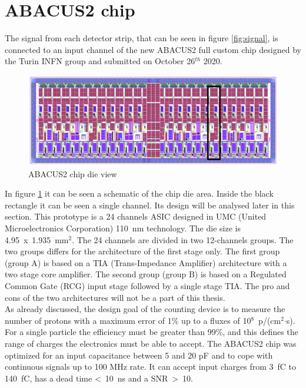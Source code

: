 \section{ABACUS2 chip}\label{chip}
\noindent The signal from each detector strip, that can be seen in figure \ref{fig:signal}, is connected to an input channel of the new ABACUS2 full custom chip\cite{abacus}\cite{dac} designed by the Turin INFN group and submitted on October 26$^{th}$ 2020.
\begin{figure}[H]
	\centering
	\includegraphics[width=0.9\linewidth]{IMG/ch2/ABACUS2.png}
	\caption{ABACUS2 chip die view}
	\label{fig:abacus2}
\end{figure}
\noindent In figure \ref{fig:abacus2} it can be seen a schematic of the chip die area. Inside the black rectangle it can be seen a single channel. Its design will be analysed later in this section.
This prototype is a 24 channels ASIC designed in UMC (United Microelectronics Corporation) 110~nm technology.
The die size is 4.95~x~1.935~mm$^2$.
The 24 channels are divided in two 12-channels groups. The two groups differs for the architecture of the first stage only.
The first group (group A) is based on a TIA (Trans-Impedance Amplifier) architecture with a two stage core amplifier.
The second group (group B) is based on a Regulated Common Gate (RCG) input stage followed by a single stage TIA.
The pro and cons of the two architectures will not be a part of this thesis.\\
As already discussed, the design goal of the counting device is to measure the number of protons with a maximum error of 1\% up to a fluxes of 10$^8$~p/(cm$^2$$\cdot$s).
For a single particle the efficiency must be greater than 99\%, and this defines the range of charges the electronics must be able to accept.
The ABACUS2 chip was optimized for an input capacitance between 5 and 20 pF and to cope with continuous signals up to 100 MHz rate.
It can accept input charges from 3~fC to 140~fC, has a dead time <~10~ns and a SNR~>~10. 

